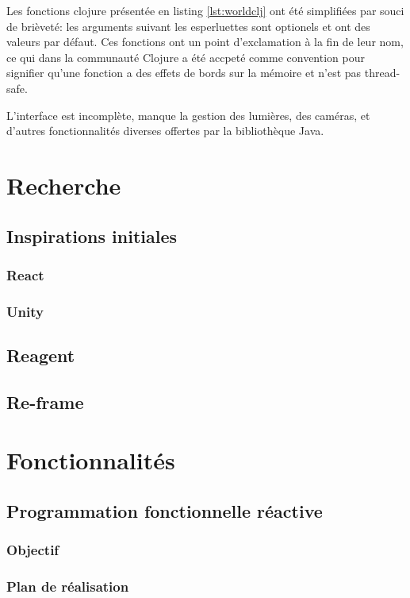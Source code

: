 \documentclass{report}
\begin{document}
Les fonctions clojure présentée en listing \ref{lst:worldclj} ont été
simplifiées par souci de brièveté: les arguments suivant les esperluettes sont
optionels et ont des valeurs par défaut.
Ces fonctions ont un point d'exclamation à la fin de leur nom, ce qui dans la
communauté Clojure a été accpeté comme convention pour signifier qu'une fonction
a des effets de bords sur la mémoire et n'est pas \og thread-safe.\fg{}

L'interface est incomplète, manque la gestion des lumières, des caméras, et
d'autres fonctionnalités diverses offertes par la bibliothèque Java.

\chapter{Recherche}

\section{Inspirations initiales}
\subsection{React}

\subsection{Unity}
\section{Reagent}
\section{Re-frame}

\chapter{Fonctionnalités}
\section{Programmation fonctionnelle réactive}
\subsection{Objectif}
\subsection{Plan de réalisation}
\end{document}
